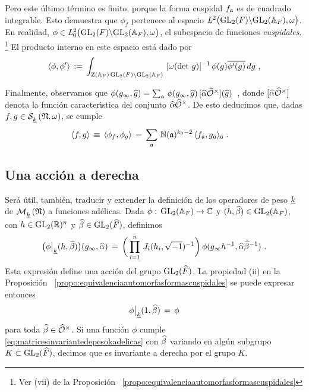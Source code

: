 %
Pero este \'{u}ltimo t\'{e}rmino es finito, porque la forma cuspidal
$f_{\frak{a}}$ es de cuadrado integrable. Esto demuestra que $\phi_{f}$
pertenece al espacio $\cuadradointegrables{\omega}$. En realidad,
$\phi\in\cuadradocuspidales{\omega}$, el subespacio de funciones
\emph{cuspidales}.%
\footnote{
	Ver (vii) de la Proposici\'{o}n~%
	\ref{propo:equivalenciaautomorfasformascuspidales}
}
El producto interno en este espacio est\'{a} dado por
\begin{equation}
	\label{eq:peterssonenadelesmatrices}
	\langle \phi,\phi'\rangle \,:=\,
	\int_{\centre(\adeles{F})\,\GL_{2}(F)\backslash\GL_{2}(\adeles{F})}\,
		|\omega(\det\,g)|^{-1}\,\phi(g)\lconj{\phi'(g)}\,dg
	\text{ ,}
\end{equation}
%

Finalmente, observamos que
\begin{math}
	\phi(g_{\infty},\hhat{g}) =\sum_{\frak{a}}\,
		\phi(g_{\infty},\hhat{g})\,
		[\hhat{\alpha}\Idfin{\cal{O}}](\hhat{g})
\end{math}~,
donde $[\hhat{\alpha}\Idfin{\cal{O}}]$ denota la funci\'{o}n
caracter\'{\i}stica del conjunto $\hhat{\alpha}\Idfin{\cal{O}}$. De esto
deducimos que, dadas $f,g\in\spitzH{k}{\frak{N},\omega}$, se cumple
\begin{align*}
	\langle f,g\rangle & \,\equiv\,\langle\phi_{f},\phi_{g}\rangle\,=\,
		\sum_{\frak{a}}\,\idnorm(\frak{a})^{k_{0}-2}\,
		\langle f_{\frak{a}},g_{\frak{a}}\rangle_{\frak{a}}
	\text{ .}
\end{align*}
%

\subsection{Una acci\'{o}n a derecha}%
	\label{subsec:operadoresdepesokadelesmatrices}
Ser\'{a} \'{u}til, tambi\'{e}n, traducir y extender la definici\'{o}n de los
operadores de peso $\peso{k}$ de $\modularH{k}{\frak{N}}$ a funciones
ad\'{e}licas. Dada $\phi:\,\GL_{2}(\adeles{F})\rightarrow\bb{C}$ y
$(h,\hhat{\beta})\in\GL_{2}(\adeles{F})$, con $h\in\GL_{2}(\bb{R})^{n}$ y
$\hhat{\beta}\in\GL_{2}(\Adfin{F})$, definimos
\begin{equation}
	\label{eq:operadordepesokenadelesmatrices}
	\big(\phi\operadormatrices{\peso{k}}{(h,\hhat{\beta})}\big)
		(g_{\infty},\hhat{\alpha}) \,=\,
		\bigg(\prod_{i=1}^{n}\,J_{i}(h_{i},\sqrt{-1})^{-1}\bigg)\,
		\phi(g_{\infty}h^{-1},\hhat{\alpha}\hhat{\beta}^{-1})
	\text{ .}
\end{equation}
%
Esta expresi\'{o}n define una acci\'{o}n del grupo $\GL_{2}(\Adfin{F})$. La
propiedad (ii) en la Proposici\'{o}n~%
\ref{propo:equivalenciaautomorfasformascuspidales} se puede expresar entonces
\begin{equation}
	\label{eq:matricesinvariantedepesokadelicas}
	\phi\operadormatrices{\peso{k}}(1,\hhat{\beta}) \,=\, \phi
\end{equation}
%
para toda $\hhat{\beta}\in\Idfin{\cal{O}}$.
Si una funci\'{o}n $\phi$ cumple \eqref{eq:matricesinvariantedepesokadelicas}
con $\hhat{\beta}$ variando en alg\'{u}n subgrupo $K\subset\GL_{2}(\Adfin{F})$,
decimos que es invariante a derecha por el grupo $K$.

